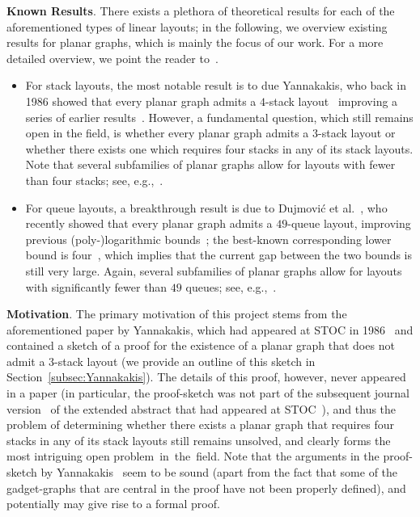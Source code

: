 \documentclass[runningheads]{llncs}
\newcommand{\myparagraph}[1]{\medskip\noindent\textbf{#1}.}
\begin{document}
\myparagraph{Known Results} There exists a plethora of theoretical results for each of the aforementioned types of linear layouts; in the following, we overview existing results for planar graphs, which is mainly the focus of our work. For a more detailed overview, we point the reader to~\cite{DBLP:journals/dmtcs/DujmovicW04}. 
%
\begin{itemize}[--]
\item For stack layouts, the most notable result is to due Yannakakis, who back in 1986 showed that every planar graph admits a $4$-stack layout~\cite{DBLP:conf/stoc/Yannakakis86,DBLP:journals/jcss/Yannakakis89} improving a series of earlier results~\cite{DBLP:conf/stoc/BussS84,DBLP:conf/focs/Heath84,Istrail1988a}. However, a fundamental question, which still remains open in the field, is whether every planar graph admits a $3$-stack layout or whether there exists one which requires four stacks in any of its stack layouts. Note that several subfamilies of planar graphs allow for layouts with fewer than four stacks; see, e.g.,~\cite{DBLP:journals/algorithmica/BekosGR16,DBLP:journals/jct/BernhartK79,DBLP:journals/mp/CornuejolsNP83,DBLP:journals/dcg/FraysseixMP95,Ewald1973,DBLP:conf/focs/Heath84,DBLP:journals/appml/KainenO07,NC08,DBLP:conf/cocoon/RengarajanM95}. 
\item For queue layouts, a breakthrough result is due to Dujmovi\'c et al.~\cite{constant}, who recently showed that every planar graph admits a $49$-queue layout, improving previous (poly-)logarithmic bounds~\cite{DBLP:journals/corr/BannisterDDEW18,DBLP:journals/jgaa/DujmovicF18,DBLP:journals/siamcomp/BattistaFP13}; the best-known corresponding lower bound is four~\cite{DBLP:conf/gd/AlamBG0P18}, which implies that the current gap between the two bounds is still very large. Again, several subfamilies of planar graphs allow for layouts with significantly fewer than $49$ queues; see, e.g.,~\cite{DBLP:conf/gd/AlamBG0P18,Ganley95,DBLP:journals/siamdm/HeathLR92,DBLP:journals/siamcomp/HeathR92,DBLP:conf/cocoon/RengarajanM95}.
\end{itemize}
%
\myparagraph{Motivation} The primary motivation of this project stems from the aforementioned paper by Yannakakis, which had appeared at STOC in 1986~\cite{DBLP:conf/stoc/Yannakakis86} and contained a sketch of a proof for the existence of a planar graph that does not admit a $3$-stack layout (we provide an outline of this sketch in Section~\ref{subsec:Yannakakis}). The details of this proof, however, never appeared in a paper (in particular, the proof-sketch was not part of the subsequent journal version~\cite{DBLP:journals/jcss/Yannakakis89} of the extended abstract that had appeared at STOC~\cite{DBLP:conf/stoc/Yannakakis86}), and thus the problem of determining whether there exists a planar graph that requires four stacks in any of its stack layouts still remains unsolved, and clearly forms the most intriguing open problem~in~the~field. Note that the arguments in the proof-sketch by Yannakakis~\cite{DBLP:conf/stoc/Yannakakis86} seem to be sound (apart from the fact that some of the gadget-graphs that are central in the proof have not been properly defined), and potentially may give rise to a formal proof. 
\end{document}
